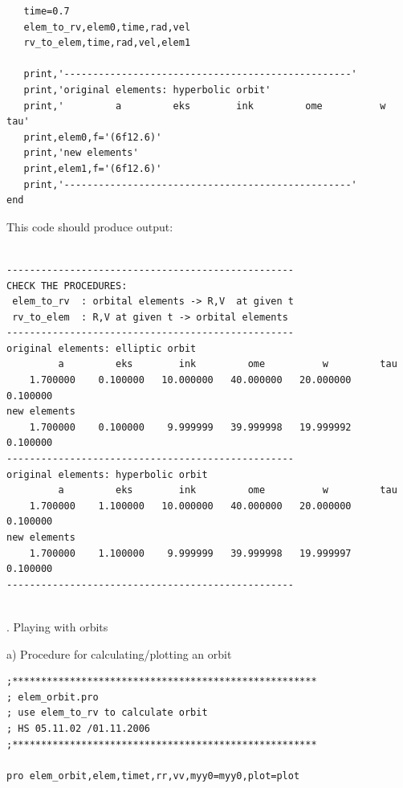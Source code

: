 \documentclass[a4paper,12pt]{article}
\def\red{\color{red}}
\def\black{\color{RGBblack}}
\begin{document}
{{{{\begin{verbatim}
   time=0.7
   elem_to_rv,elem0,time,rad,vel
   rv_to_elem,time,rad,vel,elem1

   print,'--------------------------------------------------'
   print,'original elements: hyperbolic orbit'
   print,'         a         eks        ink         ome          w         tau'
   print,elem0,f='(6f12.6)'
   print,'new elements'
   print,elem1,f='(6f12.6)'
   print,'--------------------------------------------------'
end
\end{verbatim}
\black}


This code should produce output:

{\red \scriptsize
\begin{verbatim}

--------------------------------------------------
CHECK THE PROCEDURES:
 elem_to_rv  : orbital elements -> R,V  at given t
 rv_to_elem  : R,V at given t -> orbital elements
--------------------------------------------------
original elements: elliptic orbit
         a         eks        ink         ome          w         tau
    1.700000    0.100000   10.000000   40.000000   20.000000    0.100000
new elements
    1.700000    0.100000    9.999999   39.999998   19.999992    0.100000
--------------------------------------------------
original elements: hyperbolic orbit
         a         eks        ink         ome          w         tau
    1.700000    1.100000   10.000000   40.000000   20.000000    0.100000
new elements
    1.700000    1.100000    9.999999   39.999998   19.999997    0.100000
--------------------------------------------------


\end{verbatim}
\black}



\newpage

\black
{. Playing with orbits}

{\medb a) Procedure for calculating/plotting an orbit} ~~ 


{\red \scriptsize
\begin{verbatim}
;*****************************************************
; elem_orbit.pro
; use elem_to_rv to calculate orbit
; HS 05.11.02 /01.11.2006
;*****************************************************

pro elem_orbit,elem,timet,rr,vv,myy0=myy0,plot=plot


\end{verbatim}}}}}
\end{document}
